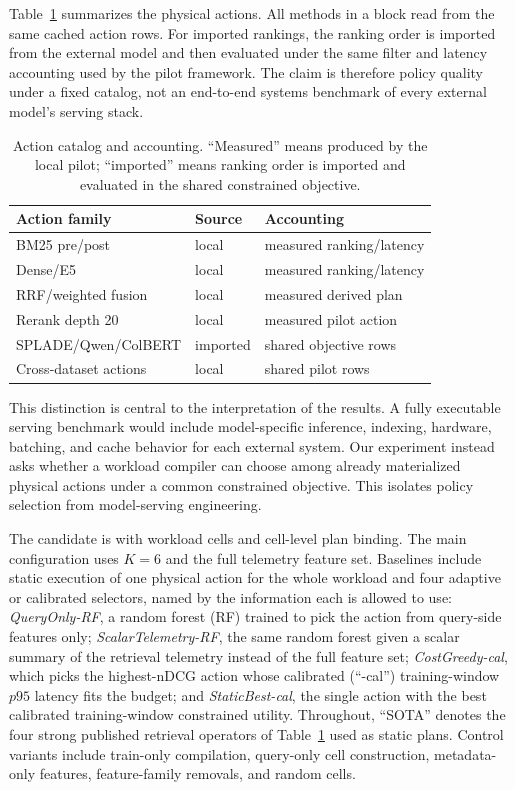 Table~\ref{tab:catalog} summarizes the physical actions. All methods in a block read from the same cached action rows. For imported rankings, the ranking order is imported from the external model and then evaluated under the same filter and latency accounting used by the pilot framework. The claim is therefore policy quality under a fixed catalog, not an end-to-end systems benchmark of every external model's serving stack.

\begin{table}[t]
\centering
\caption{Action catalog and accounting. ``Measured'' means produced by the local pilot; ``imported'' means ranking order is imported and evaluated in the shared constrained objective.}
\label{tab:catalog}
\footnotesize
\begin{tabular}{lll}
\toprule
Action family & Source & Accounting \\
\midrule
BM25 pre/post & local & measured ranking/latency \\
Dense/E5 & local & measured ranking/latency \\
RRF/weighted fusion & local & measured derived plan \\
Rerank depth 20 & local & measured pilot action \\
SPLADE/Qwen/ColBERT & imported & shared objective rows \\
Cross-dataset actions & local & shared pilot rows \\
\bottomrule
\end{tabular}
\end{table}

This distinction is central to the interpretation of the results. A fully executable serving benchmark would include model-specific inference, indexing, hardware, batching, and cache behavior for each external system. Our experiment instead asks whether a workload compiler can choose among already materialized physical actions under a common constrained objective. This isolates policy selection from model-serving engineering.

The candidate is \WCR{} with workload cells and cell-level plan binding. The main configuration uses $K=6$ and the full telemetry feature set. Baselines include static execution of one physical action for the whole workload and four adaptive or calibrated selectors, named by the information each is allowed to use: \emph{QueryOnly-RF}, a random forest (RF) trained to pick the action from query-side features only; \emph{ScalarTelemetry-RF}, the same random forest given a scalar summary of the retrieval telemetry instead of the full feature set; \emph{CostGreedy-cal}, which picks the highest-nDCG action whose calibrated (``-cal'') training-window $p95$ latency fits the budget; and \emph{StaticBest-cal}, the single action with the best calibrated training-window constrained utility. Throughout, ``SOTA'' denotes the four strong published retrieval operators of Table~\ref{tab:catalog} used as static plans. Control variants include train-only compilation, query-only cell construction, metadata-only features, feature-family removals, and random cells.

